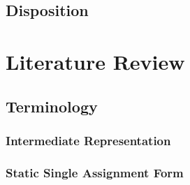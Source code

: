 \documentclass[12pt, a4paper]{article}
\begin{document}
%
%


\subsection{Disposition}



\section{Literature Review}


\subsection{Terminology}



\subsubsection{Intermediate Representation}


\subsubsection{Static Single Assignment Form}
\end{document}
